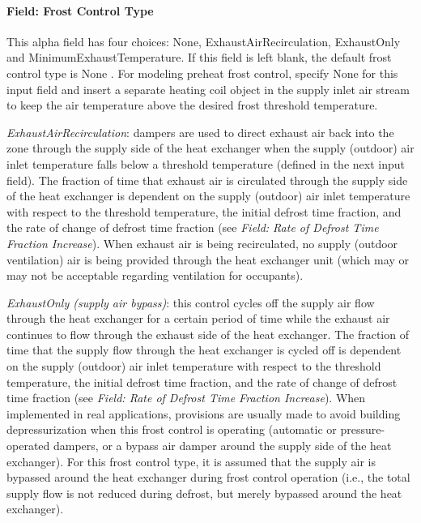 \paragraph{Field: Frost Control Type}\label{field-frost-control-type}

This alpha field has four choices: None, ExhaustAirRecirculation, ExhaustOnly and MinimumExhaustTemperature. If this field is left blank, the default frost control type is None . For modeling preheat frost control, specify None for this input field and insert a separate heating coil object in the supply inlet air stream to keep the air temperature above the desired frost threshold temperature.

\emph{ExhaustAirRecirculation}: dampers are used to direct exhaust air back into the zone through the supply side of the heat exchanger when the supply (outdoor) air inlet temperature falls below a threshold temperature (defined in the next input field). The fraction of time that exhaust air is circulated through the supply side of the heat exchanger is dependent on the supply (outdoor) air inlet temperature with respect to the threshold temperature, the initial defrost time fraction, and the rate of change of defrost time fraction (see \emph{Field: Rate of Defrost Time Fraction Increase}). When exhaust air is being recirculated, no supply (outdoor ventilation) air is being provided through the heat exchanger unit (which may or may not be acceptable regarding ventilation for occupants).

\emph{ExhaustOnly (supply air bypass)}: this control cycles off the supply air flow through the heat exchanger for a certain period of time while the exhaust air continues to flow through the exhaust side of the heat exchanger. The fraction of time that the supply flow through the heat exchanger is cycled off is dependent on the supply (outdoor) air inlet temperature with respect to the threshold temperature, the initial defrost time fraction, and the rate of change of defrost time fraction (see \emph{Field: Rate of Defrost Time Fraction Increase}). When implemented in real applications, provisions are usually made to avoid building depressurization when this frost control is operating (automatic or pressure-operated dampers, or a bypass air damper around the supply side of the heat exchanger). For this frost control type, it is assumed that the supply air is bypassed around the heat exchanger during frost control operation (i.e., the total supply flow is not reduced during defrost, but merely bypassed around the heat exchanger).

